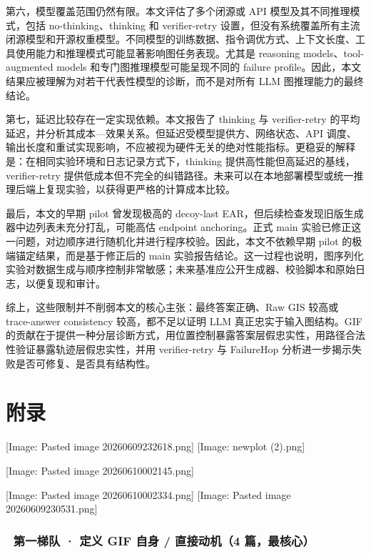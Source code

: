 \documentclass[
  11pt,
]{article}
\begin{document}
第六，模型覆盖范围仍然有限。本文评估了多个闭源或 API
模型及其不同推理模式，包括 no-thinking、thinking 和 verifier-retry
设置，但没有系统覆盖所有主流闭源模型和开源权重模型。不同模型的训练数据、指令调优方式、上下文长度、工具使用能力和推理模式可能显著影响图任务表现。尤其是
reasoning models、tool-augmented models 和专门图推理模型可能呈现不同的
failure
profile。因此，本文结果应被理解为对若干代表性模型的诊断，而不是对所有
LLM 图推理能力的最终结论。

第七，延迟比较存在一定实现依赖。本文报告了 thinking 与 verifier-retry
的平均延迟，并分析其成本---效果关系。但延迟受模型提供方、网络状态、API
调度、输出长度和重试实现影响，不应被视为硬件无关的绝对性能指标。更稳妥的解释是：在相同实验环境和日志记录方式下，thinking
提供高性能但高延迟的基线，verifier-retry
提供低成本但不完全的纠错路径。未来可以在本地部署模型或统一推理后端上复现实验，以获得更严格的计算成本比较。

最后，本文的早期 pilot 曾发现极高的 decoy-last
EAR，但后续检查发现旧版生成器中边列表未充分打乱，可能高估 endpoint
anchoring。正式 main
实验已修正这一问题，对边顺序进行随机化并进行程序校验。因此，本文不依赖早期
pilot 的极端锚定结果，而是基于修正后的 main
实验报告结论。这一过程也说明，图序列化实验对数据生成与顺序控制非常敏感；未来基准应公开生成器、校验脚本和原始日志，以便复现和审计。

综上，这些限制并不削弱本文的核心主张：最终答案正确、Raw GIS 较高或
trace-answer consistency 较高，都不足以证明 LLM
真正忠实于输入图结构。GIF
的贡献在于提供一种分层诊断方式，用位置控制暴露答案层假忠实性，用路径合法性验证暴露轨迹层假忠实性，并用
verifier-retry 与 FailureHop
分析进一步揭示失败是否可修复、是否具有结构性。

\section{附录}\label{ux9644ux5f55}

{[}Image: Pasted image 20260609232618.png{]} {[}Image: newplot
(2).png{]}

{[}Image: Pasted image 20260610002145.png{]}

{[}Image: Pasted image 20260610002334.png{]} {[}Image: Pasted image
20260609230531.png{]}

\subsubsection{🎯 第一梯队 · 定义 GIF 自身 / 直接动机（4
篇，最核心）}\label{ux7b2cux4e00ux68afux961f-ux5b9aux4e49-gif-ux81eaux8eab-ux76f4ux63a5ux52a8ux673a4-ux7bc7ux6700ux6838ux5fc3}
\end{document}
